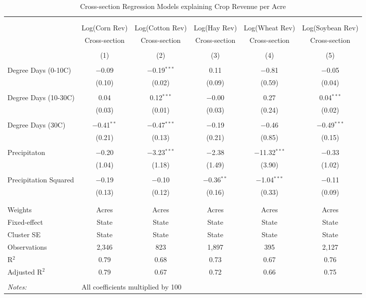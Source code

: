 \documentclass[10pt]{article}
\begin{document}
\begin{table}[!htbp] \centering 
  \caption{Cross-section Regression Models explaining Crop Revenue per Acre} 
  \label{} 
\footnotesize 
\begin{tabular}{@{\extracolsep{5pt}}lccccc} 
\\[-1.8ex]\hline 
\hline \\[-1.8ex] 
\\[-1.8ex] & Log(Corn Rev) & Log(Cotton Rev) & Log(Hay Rev) & Log(Wheat Rev) & Log(Soybean Rev) \\ 
 & Cross-section & Cross-section & Cross-section & Cross-section & Cross-section \\ 
\\[-1.8ex] & (1) & (2) & (3) & (4) & (5)\\ 
\hline \\[-1.8ex] 
 Degree Days (0-10C) & $-$0.09 & $-$0.19$^{***}$ & 0.11 & $-$0.81 & $-$0.05 \\ 
  & (0.10) & (0.02) & (0.09) & (0.59) & (0.04) \\ 
  & & & & & \\ 
 Degree Days (10-30C) & 0.04 & 0.12$^{***}$ & $-$0.00 & 0.27 & 0.04$^{***}$ \\ 
  & (0.03) & (0.01) & (0.03) & (0.24) & (0.02) \\ 
  & & & & & \\ 
 Degree Days (30C) & $-$0.41$^{**}$ & $-$0.47$^{***}$ & $-$0.19 & $-$0.46 & $-$0.49$^{***}$ \\ 
  & (0.21) & (0.13) & (0.21) & (0.85) & (0.15) \\ 
  & & & & & \\ 
 Precipitaton & $-$0.20 & $-$3.23$^{***}$ & $-$2.38 & $-$11.32$^{***}$ & $-$0.33 \\ 
  & (1.04) & (1.18) & (1.49) & (3.90) & (1.02) \\ 
  & & & & & \\ 
 Precipitation Squared & $-$0.19 & $-$0.10 & $-$0.36$^{**}$ & $-$1.04$^{***}$ & $-$0.11 \\ 
  & (0.13) & (0.12) & (0.16) & (0.33) & (0.09) \\ 
  & & & & & \\ 
\hline \\[-1.8ex] 
Weights & Acres & Acres & Acres & Acres & Acres \\ 
Fixed-effect & State & State & State & State & State \\ 
Cluster SE & State & State & State & State & State \\ 
Observations & 2,346 & 823 & 1,897 & 395 & 2,127 \\ 
R$^{2}$ & 0.79 & 0.68 & 0.73 & 0.67 & 0.76 \\ 
Adjusted R$^{2}$ & 0.79 & 0.67 & 0.72 & 0.66 & 0.75 \\ 
\hline 
\hline \\[-1.8ex] 
\textit{Notes:} & \multicolumn{5}{l}{All coefficients multiplied by 100} \\ 
\end{tabular} 
\end{table} 
\end{document}
